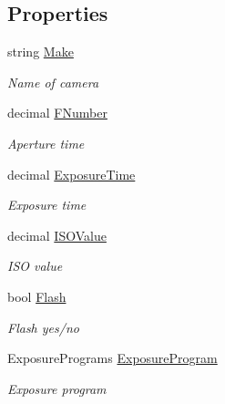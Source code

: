 \subsection*{Properties}
\begin{DoxyCompactItemize}
\item 
string \mbox{\hyperlink{class_pic_d_b_1_1_models_1_1_e_x_i_f_model_add8195f63a8094a737c6e8c0fab40a4c}{Make}}
\begin{DoxyCompactList}\small\item\em Name of camera \end{DoxyCompactList}\item 
decimal \mbox{\hyperlink{class_pic_d_b_1_1_models_1_1_e_x_i_f_model_a326f8e0218c55ec7420dc9399f801acd}{F\+Number}}
\begin{DoxyCompactList}\small\item\em Aperture time \end{DoxyCompactList}\item 
decimal \mbox{\hyperlink{class_pic_d_b_1_1_models_1_1_e_x_i_f_model_ade6128c11991881da9dd4f1f55759995}{Exposure\+Time}}
\begin{DoxyCompactList}\small\item\em Exposure time \end{DoxyCompactList}\item 
decimal \mbox{\hyperlink{class_pic_d_b_1_1_models_1_1_e_x_i_f_model_a5c5d3dacfde036fa7f8d3e47abca243d}{I\+S\+O\+Value}}
\begin{DoxyCompactList}\small\item\em I\+SO value \end{DoxyCompactList}\item 
bool \mbox{\hyperlink{class_pic_d_b_1_1_models_1_1_e_x_i_f_model_ad9ac8a10c349993d1b974a4391b31b12}{Flash}}
\begin{DoxyCompactList}\small\item\em Flash yes/no \end{DoxyCompactList}\item 
Exposure\+Programs \mbox{\hyperlink{class_pic_d_b_1_1_models_1_1_e_x_i_f_model_ab2e1564e3b371bfa07470d9e7b5d98e1}{Exposure\+Program}}
\begin{DoxyCompactList}\small\item\em Exposure program \end{DoxyCompactList}\end{DoxyCompactItemize}


